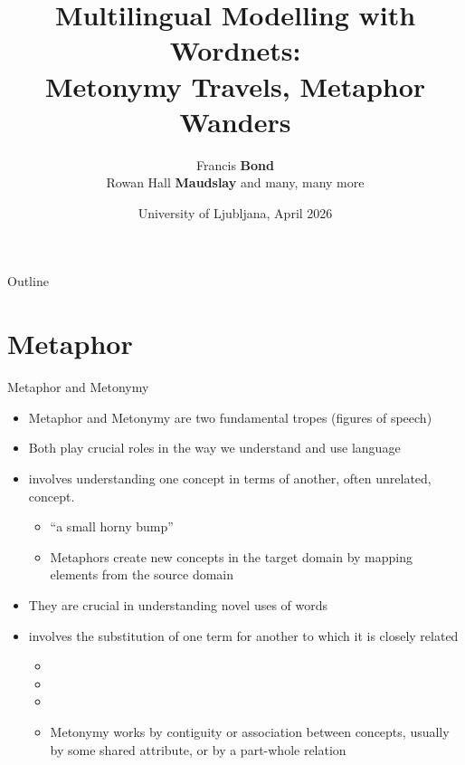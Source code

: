 \documentclass[xetex]{beamer}
\title[Wordnets and Metaphor]{Multilingual Modelling with Wordnets:
  \\ Metonymy Travels, Metaphor Wanders}
\author[Bond and many more]{Francis \textbf{Bond} 
  \\ Rowan Hall \textbf{Maudslay} and many, many more}
\institute[Palacký]{Asian Studies  \& Sinofon Center
  \\ General Linguistics
\\[1ex]  Palacký University, Olomouc, Czechia
\\[1.5ex] \url{<bond@ieee.org>}}
\date[JOTA 2026]{University of Ljubljana, April 2026}
\begin{document}
\maketitle

\begin{frame}{Outline}
   \tableofcontents
 \end{frame}


\section{Metaphor}
\begin{frame}{Metaphor and Metonymy}

  \begin{itemize}
  \item Metaphor and Metonymy are two fundamental tropes (figures of speech)
  \item Both play crucial roles in the way we understand and use language
  \item {} involves understanding one concept in terms of
    another, often unrelated, concept.
     \begin{itemize}
    \item {} ``a small horny bump''
    \item Metaphors create new concepts in the target domain by
      mapping elements from the source domain
    \end{itemize}
    \item They are crucial in understanding novel uses of words
  \item {} involves the substitution of one term for
    another to which it is closely related
    \begin{itemize}
    \item {}
    \item {}
    \item {}
    \item Metonymy works by contiguity or association between concepts,
      usually by some shared attribute, or by a part-whole relation
    \end{itemize}
  \end{itemize}

\end{frame}
\end{document}
